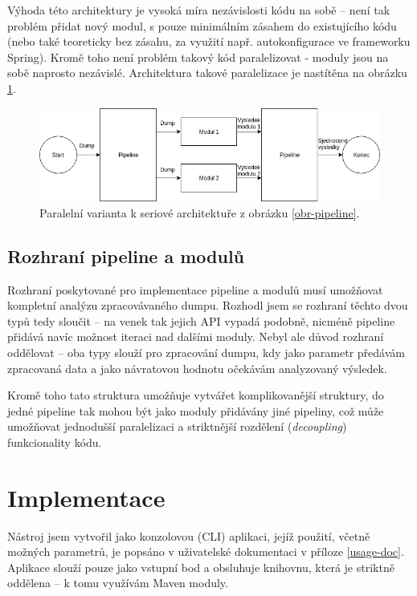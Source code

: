 Výhoda této architektury je vysoká míra nezávislosti kódu na sobě -- není tak problém přidat nový modul, s pouze minimálním zásahem do existujícího kódu (nebo také teoreticky bez zásahu, za využití např. autokonfigurace ve frameworku Spring). Kromě toho není problém takový kód paralelizovat - moduly jsou na sobě naprosto nezávislé. Architektura takové paralelizace je nastítěna na obrázku \ref{obr-pipeline-parallel}.

\begin{figure}[ht!]
	\centering
	\includegraphics[scale=0.55]{obrazky/parallel_pipeline.png}
	\caption{Paralelní varianta k seriové architektuře z obrázku \ref{obr-pipeline}.}
	\label{obr-pipeline-parallel}
\end{figure}

\section{Rozhraní pipeline a modulů}
Rozhraní poskytované pro implementace pipeline a modulů musí umožňovat kompletní analýzu zpracovávaného dumpu. Rozhodl jsem se rozhraní těchto dvou typů tedy sloučit -- na venek tak jejich API vypadá podobně, nicméně pipeline přidává navíc možnost iteraci nad dalšími moduly. Nebyl ale důvod rozhraní oddělovat -- oba typy slouží pro zpracování dumpu, kdy jako parametr předávám zpracovaná data a jako návratovou hodnotu očekávám analyzovaný výsledek.

Kromě toho tato struktura umožňuje vytvářet komplikovanější struktury, do jedné pipeline tak mohou být jako moduly přidávány jiné pipeliny, což může umožňovat jednodušší paralelizaci a striktnější rozdělení (\textit{decoupling}) funkcionality kódu.

\chapter{Implementace}
Nástroj jsem vytvořil jako konzolovou (CLI) aplikaci, jejíž použití, včetně možných parametrů, je popsáno v uživatelské dokumentaci v příloze \ref{usage-doc}. Aplikace slouží pouze jako vstupní bod a obsluhuje knihovnu, která je striktně oddělena -- k tomu využívám Maven moduly. 

